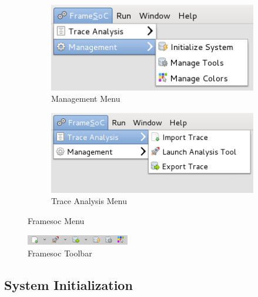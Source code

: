 \documentclass[twoside]{article}
\begin{document}
\begin{sloppypar}
\begin{figure}[h!]
  \centering
  \begin{subfigure}[c]{0.45\textwidth}
    \includegraphics[width=1.0\textwidth]{images/menu_management.png}
    \caption{Management Menu}
    \label{fig:menu_management}
  \end{subfigure}
  \hspace{30pt}
  \begin{subfigure}[c]{0.45\textwidth}
    \includegraphics[width=1.0\textwidth]{images/menu_trace_analysis.png}
    \caption{Trace Analysis Menu}
    \label{fig:menu_trace_analysis}
  \end{subfigure}
  \caption{Framesoc Menu}
  \label{fig:menu}
\end{figure}

\begin{figure}[h!]
  \centering
    \includegraphics[width=0.4\textwidth]{images/toolbar.png}
  \caption{Framesoc Toolbar}
  \label{fig:toolbar}
\end{figure}

\subsection{System Initialization}
\label{subsec:init}



\end{sloppypar}
\end{document}
